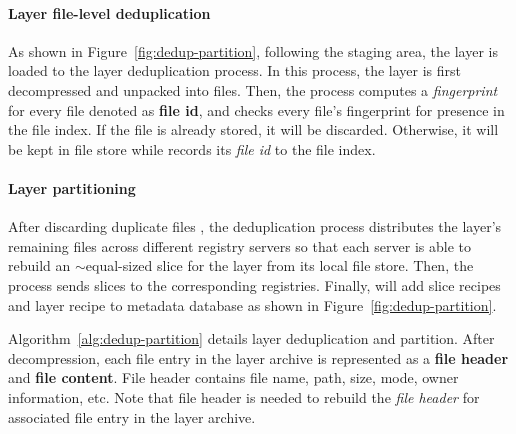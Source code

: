 \paragraph{Layer file-level deduplication}
As shown in Figure~\ref{fig:dedup-partition}, 
following the staging area, the layer is loaded to the layer deduplication process.
In this process, the layer is first decompressed and unpacked into files.
Then, 
the process computes a \emph{fingerprint} for every file denoted as \textbf{file id}, 
and checks every file's fingerprint for presence in the file index.
If the file is already stored, it will be discarded. 
Otherwise, it will be kept in file store while
\sysname records its \emph{file id} to the file index.
\paragraph{Layer partitioning}
After discarding duplicate files%
, the deduplication process distributes the layer's remaining files across different registry servers
so that each server is able to rebuild an $\sim$equal-sized slice for the layer from its local file store.
Then, the process sends slices to the corresponding registries.
Finally, \sysname will add slice recipes and layer recipe to metadata database as shown in Figure~\ref{fig:dedup-partition}.



Algorithm~\ref{alg:dedup-partition} details layer deduplication and partition.
After decompression, 
each file entry in the layer archive is represented as a \textbf{file header} and \textbf{file content}.
File header contains file name, path, size, mode, owner information, etc.
Note that file header is needed to rebuild the \emph{file header} for 
associated file entry in the layer archive.

